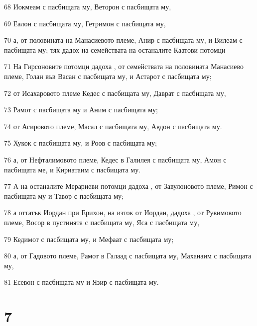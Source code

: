 \par 68 Иокмеам с пасбищата му, Веторон с пасбищата му,
\par 69 Еалон с пасбищата му, Гетримон с пасбищата му,
\par 70 а, от половината на Манасиевото племе, Анир с пасбищата му, и Вилеам с пасбищата му; тях дадох на семействата на останалите Каатови потомци
\par 71 На Гирсоновите потомци дадоха , от семействата на половината Манасиево племе, Голан във Васан с пасбищата му, и Астарот с пасбищата му;
\par 72 от Исахаровото племе Кедес с пасбищата му, Даврат с пасбищата му,
\par 73 Рамот с пасбищата му и Аним с пасбищата му;
\par 74 от Асировото племе, Масал с пасбищата му, Авдон с пасбищата му.
\par 75 Хукок с пасбищата му, и Роов с пасбищата му;
\par 76 а, от Нефталимовото племе, Кедес в Галилея с пасбищата му, Амон с пасбищата ме, и Кириатаим с пасбищата му.
\par 77 А на останалите Мерариеви потомци дадоха , от Завулоновото племе, Римон с пасбищата му и Тавор с пасбищата му;
\par 78 а оттатък Иордан при Ерихон, на изток от Иордан, дадоха , от Рувимовото племе, Восор в пустинята с пасбищата му, Яса с пасбищата му,
\par 79 Кедимот с пасбищата му, и Мефаат с пасбищата му;
\par 80 а, от Гадовото племе, Рамот в Галаад с пасбищата му, Маханаим с пасбищата му,
\par 81 Есевон с пасбищата му и Язир с пасбищата му.

\chapter{7}

